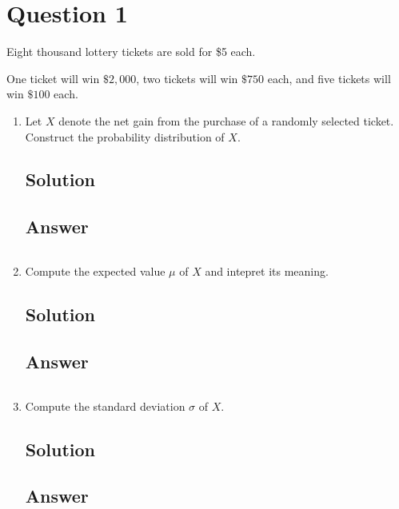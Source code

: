 \documentclass[12pt]{article}
\begin{document}
	
	\section*{Question 1}
	
	\noindent Eight thousand lottery tickets are sold for \$5 each.
	
	\noindent One ticket will win $\$2,000$, two tickets will win $\$750$ each, and five tickets will win $\$100$ each.
	
	\bigskip
	
	\begin{enumerate}[start=1,label={\bfseries Part \arabic*:},leftmargin=0in]
		\bigskip\item Let $X$ denote the net gain from the purchase of a randomly selected ticket. Construct the probability distribution of $X$.
		
		\subsection*{Solution}
		
		\subsection*{Answer}
		
			\[\boxed{}\]
		
		\bigskip\item Compute the expected value $\mu$ of $X$ and intepret its meaning.
		
		\subsection*{Solution}
		
		\subsection*{Answer}
		
			\[\boxed{}\]
			
		\bigskip\item Compute the standard deviation $\sigma$ of $X$.
		
		\subsection*{Solution}
		
		\subsection*{Answer}
		
			\[\boxed{}\]
	\end{enumerate}
	
\end{document}
